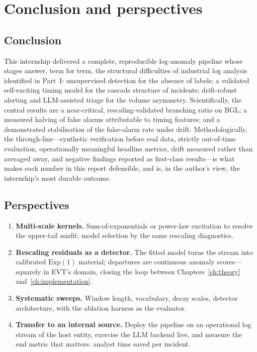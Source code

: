 \documentclass[11pt,a4paper]{report}
\begin{document}
\chapter{Conclusion and perspectives}
\label{ch:conclusion}

\section{Conclusion}
This internship delivered a complete, reproducible log-anomaly pipeline
whose stages answer, term for term, the structural difficulties of
industrial log analysis identified in Part~I: unsupervised detection for
the absence of labels; a validated self-exciting timing model for the
cascade structure of incidents; drift-robust alerting and LLM-assisted
triage for the volume asymmetry. Scientifically, the central results are a
near-critical, rescaling-validated branching ratio on BGL; a measured
halving of false alarms attributable to timing features; and a
demonstrated stabilisation of the false-alarm rate under drift.
Methodologically, the through-line---synthetic verification before real
data, strictly out-of-time evaluation, operationally meaningful headline
metrics, drift measured rather than averaged away, and negative findings
reported as first-class results---is what makes each number in this report
defensible, and is, in the author's view, the internship's most durable
outcome.

\section{Perspectives}
\begin{enumerate}[nosep,leftmargin=1.6em]
  \item \textbf{Multi-scale kernels.} Sum-of-exponentials or power-law
  excitation to resolve the upper-tail misfit; model selection by the same
  rescaling diagnostics.
  \item \textbf{Rescaling residuals as a detector.} The fitted model turns
  the stream into calibrated $\mathrm{Exp}(1)$ material; departures are
  continuous anomaly scores---squarely in EVT's domain, closing the loop
  between Chapters~\ref{ch:theory} and~\ref{ch:implementation}.
  \item \textbf{Systematic sweeps.} Window length, vocabulary, decay
  scales, detector architecture, with the ablation harness as the
  evaluator.
  \item \textbf{Transfer to an internal source.} Deploy the pipeline on an
  operational log stream of the host entity, exercise the LLM backend
  live, and measure the end metric that matters: analyst time saved per
  incident.
\end{enumerate}
\end{document}

